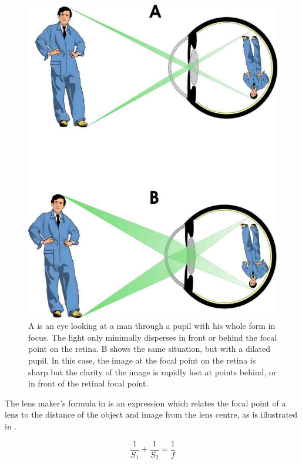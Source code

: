 \begin{figure}[!ht]
\centering
  \includegraphics{figures/light_path}
\caption{A is an eye looking at a man through a pupil with his whole form in focus.
		The light only minimally disperses in front or behind the focal point
		on the retina. B shows the same situation, but with a dilated pupil.
		In this case, the image at the focal point on the retina is sharp but
		the clarity of the image is rapidly lost at points behind, or in front
		of the retinal focal point.}
\label{fig:light_journey}
\end{figure}

The lens maker’s formula in  is an expression which relates the
focal point of a lens to the distance of the object and image from the lens centre,
as is illustrated in .

\begin{equation}
\frac{1}{S_1} + \frac{1}{S_2} = \frac{1}{f}
\label{eq:lens_makers}
\end{equation}


